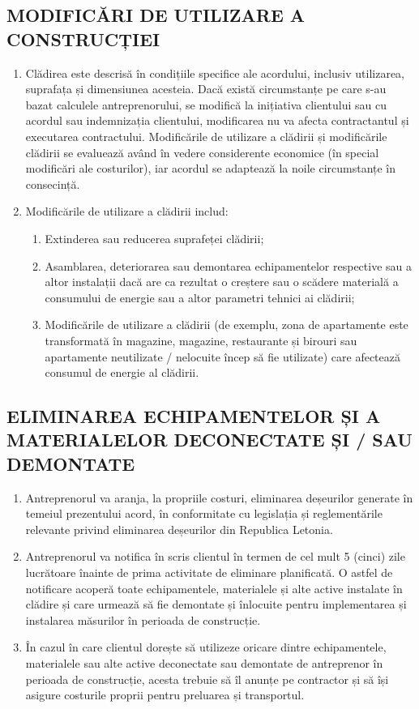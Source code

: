 \begin{multicols}{2}
\subsection{MODIFICĂRI DE UTILIZARE A CONSTRUCȚIEI}
\begin{enumerate}
\item Clădirea este descrisă în condițiile specifice ale acordului, inclusiv utilizarea, suprafața și dimensiunea acesteia. Dacă există circumstanțe pe care s-au bazat calculele antreprenorului, se modifică la inițiativa clientului sau cu acordul sau indemnizația clientului, modificarea nu va afecta contractantul și executarea contractului. Modificările de utilizare a clădirii și modificările clădirii se evaluează având în vedere considerente economice (în special modificări ale costurilor), iar acordul se adaptează la noile circumstanțe în consecință.
\item Modificările de utilizare a clădirii includ:
\begin{enumerate}
\item Extinderea sau reducerea suprafeței clădirii;
\item Asamblarea, deteriorarea sau demontarea echipamentelor respective sau a altor instalații dacă are ca rezultat o creștere sau o scădere materială a consumului de energie sau a altor parametri tehnici ai clădirii;
\item Modificările de utilizare a clădirii (de exemplu, zona de apartamente este transformată în magazine, magazine, restaurante și birouri sau apartamente neutilizate / nelocuite încep să fie utilizate) care afectează consumul de energie al clădirii.
\end{enumerate}
\end{enumerate}

\subsection{ELIMINAREA ECHIPAMENTELOR ȘI A MATERIALELOR DECONECTATE ȘI / SAU DEMONTATE}
\begin{enumerate}
\item Antreprenorul va aranja, la propriile costuri, eliminarea deșeurilor generate în temeiul prezentului acord, în conformitate cu legislația și reglementările relevante privind eliminarea deșeurilor din Republica Letonia.
\item Antreprenorul va notifica în scris clientul în termen de cel mult 5 (cinci) zile lucrătoare înainte de prima activitate de eliminare planificată. O astfel de notificare acoperă toate echipamentele, materialele și alte active instalate în clădire și care urmează să fie demontate și înlocuite pentru implementarea și instalarea măsurilor în perioada de construcție.
\item În cazul în care clientul dorește să utilizeze oricare dintre echipamentele, materialele sau alte active deconectate sau demontate de antreprenor în perioada de construcție, acesta trebuie să îl anunțe pe contractor și să își asigure costurile proprii pentru preluarea și transportul.
 \end{enumerate}


\end{multicols}
